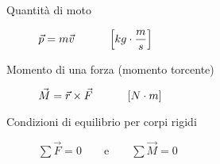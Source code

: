 \documentclass[a4paper,11pt,italian]{article}
\begin{document}
\begin{description}
  \item[Quantità di moto] 
  $ \vec{p} = m \vec{v} \hspace*{3em} \left[ kg \cdot \dfrac{m}{s} \right] $ 
  
%   
%   
%   
%   
  
  \item[Momento di una forza (momento torcente)]
  $ \vec{M} = \vec{r} \times \vec{F} \hspace*{3em} \left[ N \cdot m \right] $
  
  \item[Condizioni di equilibrio per corpi rigidi]
  $ \sum \vec{F} = 0 \quad\quad\textrm{e}\quad\quad \sum \vec{M} = 0 $


\end{description}
\end{document}
